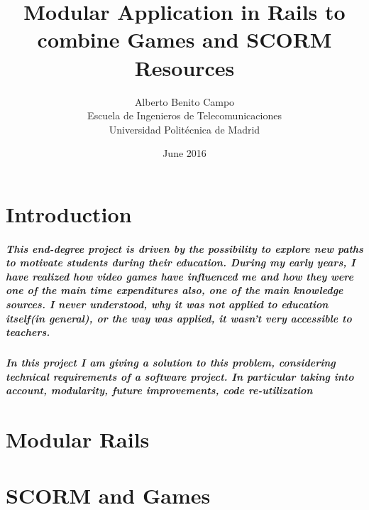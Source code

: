 \documentclass{book}
\title{Modular Application in Rails to combine Games and SCORM Resources}
\author{Alberto Benito Campo\\Escuela de Ingenieros de Telecomunicaciones\\Universidad Politécnica de Madrid}
\date{June 2016}
\begin{document}
\begin{titlepage}
\maketitle
\end{titlepage}

\chapter{Introduction}
\paragraph{This end-degree project is driven by the possibility to explore new paths to motivate students during their education. During my early years, I have realized how video games have influenced me and how they were one of the main time expenditures also, one of the main knowledge sources. I never understood, why it was not applied to education itself(in general), or the way was applied, it wasn't very accessible to teachers.}

\paragraph{In this project I am giving a solution to this problem, considering technical requirements of a software project. In particular taking into account, modularity, future improvements, code re-utilization}
\chapter{Modular Rails}

\chapter{SCORM and Games}
\end{document}
